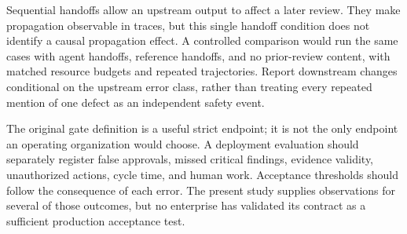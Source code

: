 Sequential handoffs allow an upstream output to affect a later review. They make propagation
observable in traces, but this single handoff condition does not identify a causal propagation
effect. A controlled comparison would run the same cases with agent handoffs, reference handoffs,
and no prior-review content, with matched resource budgets and repeated trajectories. Report
downstream changes conditional on the upstream error class, rather than treating every repeated
mention of one defect as an independent safety event.

The original gate definition is a useful strict endpoint; it is not the only endpoint an
operating organization would choose. A deployment evaluation should separately register
false approvals, missed critical findings, evidence validity, unauthorized actions, cycle time,
and human work. Acceptance thresholds should follow the consequence of each error. The present
study supplies observations for several of those outcomes, but no enterprise has validated its
contract as a sufficient production acceptance test.
